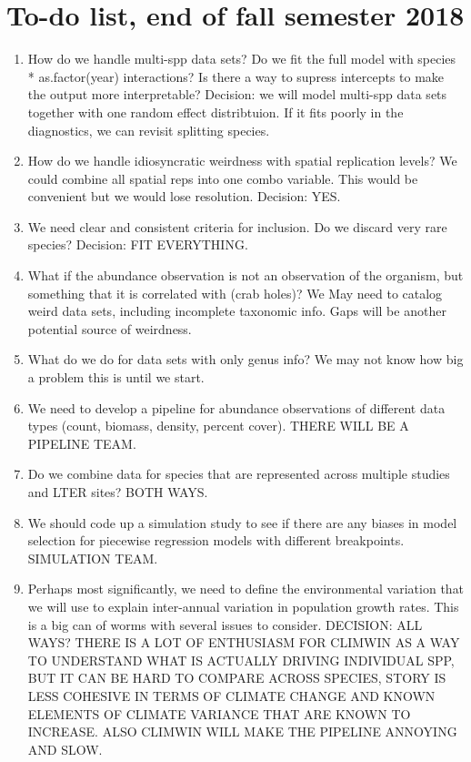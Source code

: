 \documentclass{article}
\begin{document}
\section{To-do list, end of fall semester 2018}
\begin{enumerate}

\item{How do we handle multi-spp data sets? Do we fit the full model with species * as.factor(year) interactions? Is there a way to supress intercepts to make the output more interpretable? Decision: we will model multi-spp data sets together with one random effect distribtuion. If it fits poorly in the diagnostics, we can revisit splitting species.}

\item{How do we handle idiosyncratic weirdness with spatial replication levels? We could combine all spatial reps into one combo variable. This would be convenient but we would lose resolution. Decision: YES.}

\item{We need clear and consistent criteria for inclusion. Do we discard very rare species? Decision: FIT EVERYTHING. }

\item{What if the abundance observation is not an observation of the organism, but something that it is correlated with (crab holes)?  We May need to catalog weird data sets, including incomplete taxonomic info. Gaps will be another potential source of weirdness.}

\item{What do we do for data sets with only genus info? We may not know how big a problem this is until we start.}

\item{We need to develop a pipeline for abundance observations of different data types (count, biomass, density, percent cover). THERE WILL BE A PIPELINE TEAM.}

\item{Do we combine data for species that are represented across multiple studies and LTER sites? BOTH WAYS.}

\item{We should code up a simulation study to see if there are any biases in model selection for piecewise regression models with different breakpoints. SIMULATION TEAM.}

\item{Perhaps most significantly, we need to define the environmental variation that we will use to explain inter-annual variation in population growth rates. This is a big can of worms with several issues to consider. DECISION: ALL WAYS? THERE IS A LOT OF ENTHUSIASM FOR CLIMWIN AS A WAY TO UNDERSTAND WHAT IS ACTUALLY DRIVING INDIVIDUAL SPP, BUT IT CAN BE HARD TO COMPARE ACROSS SPECIES, STORY IS LESS COHESIVE IN TERMS OF CLIMATE CHANGE AND KNOWN ELEMENTS OF CLIMATE VARIANCE THAT ARE KNOWN TO INCREASE. ALSO CLIMWIN WILL MAKE THE PIPELINE ANNOYING AND SLOW.}


\end{enumerate}
\end{document}
